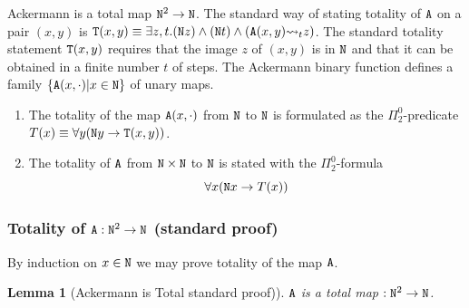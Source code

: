 \documentclass[a4paper,12pt]{article}
\newtheorem{lemma}[theorem]{Lemma}
\newcommand{\Nat}               { {\tt N}  }
\newcommand{\reduces}         { {\leadsto} }
\newcommand{\Tot}           { {\tt T} }
\newcommand{\Ack}   {{\tt A}}
\begin{document}
Ackermann is a total map $\Nat^2 \rightarrow 
\Nat$. The standard way of stating totality of $\Ack$ on a pair $(x, y)$ is 
$\Tot(x,y) \equiv \exists z, t. (\Nat z) \wedge (\Nat t) \wedge (\Ack(x,y) \reduces_t z)$. 
The standard totality statement $\Tot(x,y)$ requires that the image $z$ of $(x,y)$ is in $\Nat$ 
and that it can be obtained in a finite number $t$ of steps.
The Ackermann binary function defines a family $\{\Ack(x,\cdot)| x \in \Nat \}$ 
of unary maps. 
\begin{enumerate}
\item
The totality of the map $\Ack(x,\cdot)$ from $\Nat$ to $\Nat$ 
is formulated as the $\Pi^0_2$-predicate 
$T(x) \equiv \forall y( \Nat y \rightarrow \Tot(x,y))$. 
\item
The totality of $\Ack$ 
from $\Nat \times \Nat$ to $\Nat$ is stated with the
$\Pi^0_2$-formula $$\forall x( \Nat x \rightarrow T(x) )$$
\end{enumerate} 
 
\subsubsection{Totality of $\Ack:\Nat^2 \rightarrow \Nat$ (standard proof)}
\label{subsubsection-ackermann-standard}
By induction on $x \in \Nat$ we may prove totality of the map $\Ack$.

\begin{lemma}[Ackermann is Total standard proof)]
\label{lemma-ackermann-standard}
$\Ack$ is a total map $:\Nat^2 \rightarrow \Nat$. 
\end{lemma}
\end{document}
